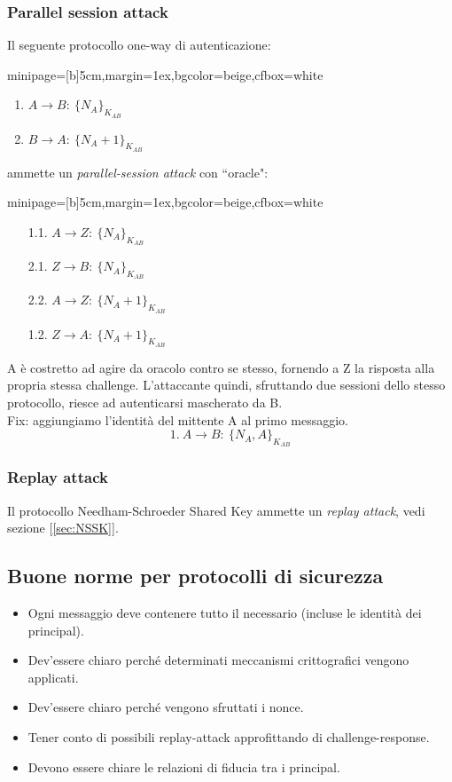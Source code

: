 \documentclass[a4paper, 11pt, twoside, openright, fleqn]{report}
\newcommand{\fromto}[2]{#1\rightarrow #2\!:\ }
\newenvironment{colbox}[2]%
{%
	\par\noindent\hspace{10pt}
	\begin{adjustbox}{minipage=[b]{#2},margin=1ex,bgcolor=#1,cfbox=white}
}{%
	\end{adjustbox}\newline%
}
\begin{document}
\subsubsection{Parallel session attack}
Il seguente protocollo one-way di autenticazione:
\begin{colbox}{beige}{5cm}
	\begin{enumerate}
		\item $\fromto{A}{B}\{N_A\}_{K_{AB}}$
		\item $\fromto{B}{A}\{N_A+1\}_{K_{AB}}$
	\end{enumerate}
\end{colbox}
ammette un \emph{parallel-session attack} con ``oracle":
\begin{colbox}{beige}{5cm}
	\begin{enumerate}
		\item[1.1.] $\fromto{A}{Z}\{N_A\}_{K_{AB}}$
		\item[2.1.] $\fromto{Z}{B}\{N_A\}_{K_{AB}}$
		\item[2.2.] $\fromto{A}{Z}\{N_A+1\}_{K_{AB}}$
		\item[1.2.] $\fromto{Z}{A}\{N_A+1\}_{K_{AB}}$
	\end{enumerate}
\end{colbox}
A è costretto ad agire da oracolo contro se stesso, fornendo a Z la risposta alla propria stessa challenge. L'attaccante quindi, sfruttando due sessioni dello stesso protocollo, riesce ad autenticarsi mascherato da B.\\
Fix: aggiungiamo l'identità del mittente A al primo messaggio.
\begin{equation*}
	1.\ \fromto{A}{B}\{N_A,A\}_{K_{AB}}
\end{equation*}

\subsubsection{Replay attack}
Il protocollo Needham-Schroeder Shared Key ammette un \emph{replay attack}, vedi sezione [\ref{sec:NSSK}].

\subsection{Buone norme per protocolli di sicurezza}
\begin{itemize}
	\item Ogni messaggio deve contenere tutto il necessario (incluse le identità dei principal).
	\item Dev'essere chiaro perché determinati meccanismi crittografici vengono applicati.
	\item Dev'essere chiaro perché vengono sfruttati i nonce.
	\item Tener conto di possibili replay-attack approfittando di challenge-response.
	\item Devono essere chiare le relazioni di fiducia tra i principal.
\end{itemize}
\end{document}
